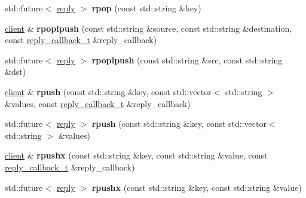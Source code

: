 \begin{DoxyCompactItemize}
std\+::future$<$ \mbox{\hyperlink{classcpp__redis_1_1reply}{reply}} $>$ {\bfseries rpop} (const std\+::string \&key)
\item 
\mbox{\label{classcpp__redis_1_1client_a1d50b5d26753768d79ebbe04f3615c7a}} 
\mbox{\hyperlink{classcpp__redis_1_1client}{client}} \& {\bfseries rpoplpush} (const std\+::string \&source, const std\+::string \&destination, const \mbox{\hyperlink{classcpp__redis_1_1client_af7a65eb21aa25230bfbb0b0203c4fc04}{reply\+\_\+callback\+\_\+t}} \&reply\+\_\+callback)
\item 
\mbox{\label{classcpp__redis_1_1client_a4c4fd3342f665a4d902b42b051797e51}} 
std\+::future$<$ \mbox{\hyperlink{classcpp__redis_1_1reply}{reply}} $>$ {\bfseries rpoplpush} (const std\+::string \&src, const std\+::string \&dst)
\item 
\mbox{\label{classcpp__redis_1_1client_a925a0b8ae7864783d9e164776ca07075}} 
\mbox{\hyperlink{classcpp__redis_1_1client}{client}} \& {\bfseries rpush} (const std\+::string \&key, const std\+::vector$<$ std\+::string $>$ \&values, const \mbox{\hyperlink{classcpp__redis_1_1client_af7a65eb21aa25230bfbb0b0203c4fc04}{reply\+\_\+callback\+\_\+t}} \&reply\+\_\+callback)
\item 
\mbox{\label{classcpp__redis_1_1client_a1e135e9e69a92a0b54059d5f81f9ff25}} 
std\+::future$<$ \mbox{\hyperlink{classcpp__redis_1_1reply}{reply}} $>$ {\bfseries rpush} (const std\+::string \&key, const std\+::vector$<$ std\+::string $>$ \&values)
\item 
\mbox{\label{classcpp__redis_1_1client_a051fdb76cf3d40bd7c0ea0dcb0eed36e}} 
\mbox{\hyperlink{classcpp__redis_1_1client}{client}} \& {\bfseries rpushx} (const std\+::string \&key, const std\+::string \&value, const \mbox{\hyperlink{classcpp__redis_1_1client_af7a65eb21aa25230bfbb0b0203c4fc04}{reply\+\_\+callback\+\_\+t}} \&reply\+\_\+callback)
\item 
\mbox{\label{classcpp__redis_1_1client_a83d512f8f44f896383d050920634489f}} 
std\+::future$<$ \mbox{\hyperlink{classcpp__redis_1_1reply}{reply}} $>$ {\bfseries rpushx} (const std\+::string \&key, const std\+::string \&value)
\item 

\end{DoxyCompactItemize}
